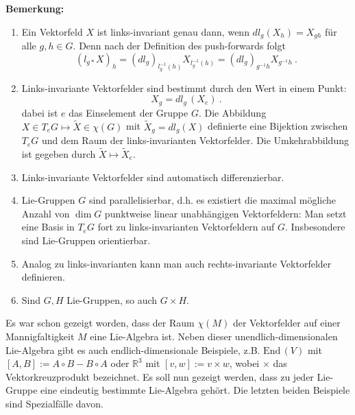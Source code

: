 \documentclass[12pt,a4paper]{article}
\def\R{\mathbb{R}}
\def\End{\mathrm{End}\,}
\begin{document}
{\bf Bemerkung:}~\begin{enumerate}
\item
Ein Vektorfeld $X$ ist links-invariant genau dann, wenn $dl_g (X_h) = X_{gh}$
f\"ur alle $g, h \in G$. Denn nach der Definition
des push-forwards folgt
$$
(l_{g*}X)_h = (dl_g)_{l_g^{-1}(h)} X_{l_g^{-1}(h)} = (dl_g)_{g^{-1}h} X_{g^{-1}h} \ .
$$
\item
Links-invariante Vektorfelder sind bestimmt durch den Wert in einem Punkt:
$$
X_g = dl_g \, (X_e) \ .
$$
dabei ist $e$ das Einselement der Gruppe $G$. Die Abbildung
$X \in T_eG \mapsto \tilde X \in \chi(G)$ mit $\tilde X_g = dl_g (X)$ definierte eine Bijektion
zwischen $T_eG$ und dem Raum der links-invarianten Vektorfelder. Die Umkehrabbildung ist
gegeben durch $\tilde X \mapsto \tilde X_e$.
\item
Links-invariante Vektorfelder sind automatisch differenzierbar.
\item
Lie-Gruppen $G$ sind parallelisierbar, d.h. es existiert die maximal m\"ogliche Anzahl von $\dim G$
punktweise linear unabh\"angigen
Vektorfeldern: Man setzt eine Basis in $T_eG$ fort zu links-invarianten Vektorfeldern auf $G$.
Insbesondere sind Lie-Gruppen orientierbar.
\item
Analog zu links-invarianten kann man auch rechts-invariante Vektorfelder definieren.
\item
Sind $G,H$ Lie-Gruppen, so auch $G\times H$.
\end{enumerate}

Es war schon gezeigt worden, dass der Raum $\chi(M)$ der Vektorfelder auf einer Mannigfaltigkeit $M$
eine Lie-Algebra ist. Neben dieser unendlich-dimensionalen Lie-Algebra gibt es auch endlich-dimensionale
Beispiele, z.B. $\End (V)$ mit $[A, B]:= A \circ B - B \circ A$ oder $\R^3$ mit
$[v, w]:= v \times w$, wobei $\times$ das Vektorkreuzprodukt bezeichnet.  Es soll nun gezeigt
werden, dass zu jeder Lie-Gruppe eine eindeutig bestimmte Lie-Algebra geh\"ort. Die letzten beiden
Beispiele sind Spezialf\"alle davon.
\end{document}
